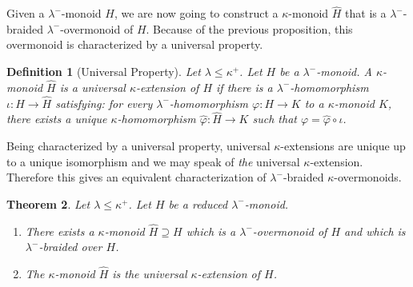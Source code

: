 \documentclass[a4paper,11pt,oneside]{amsart}
\newtheorem{teor}{Theorem}[section]
\newtheorem{defi}[teor]{Definition}
\theoremstyle{remark}
\newcommand{\defit}[1]{\textsf{#1}}
\begin{document}
Given a $\lambda^-$-monoid $H$, we are now going to construct a $\kappa$-monoid $\widehat H$ that is a $\lambda^-$-braided $\lambda^-$-overmonoid of $H$.
Because of the previous proposition, this overmonoid is characterized by a universal property.

\begin{defi}[Universal Property] \label{d:univprop}
  Let $\lambda \le \kappa^+$.
  Let $H$ be a $\lambda^-$-monoid.
  A $\kappa$-monoid $\widehat H$ is a \defit{universal $\kappa$-extension} of $H$ if there is a $\lambda^-$-homomorphism $\iota\colon H \to \widehat H$ satisfying: for every $\lambda^-$-homomorphism $\varphi\colon H \to K$ to a $\kappa$-monoid $K$, there exists a unique $\kappa$-homomorphism $\widehat{\varphi}\colon \widehat H \to K$ such that $\varphi = \widehat{\varphi} \circ \iota$.
\end{defi}

Being characterized by a universal property, universal $\kappa$-extensions are unique up to a unique isomorphism and we may speak of \emph{the} universal $\kappa$-extension.
Therefore this gives an equivalent characterization of $\lambda^-$-braided $\kappa$-overmonoids.

\begin{teor} \label{t:universal-exist}
  Let $\lambda \le \kappa^+$.
  Let $H$ be a reduced $\lambda^-$-monoid.
  \begin{enumerate}
  \item \label{ue:braided} There exists a $\kappa$-monoid $\widehat H \supseteq H$ which is a $\lambda^-$-overmonoid of $H$ and which is $\lambda^-$-braided over $H$.
  \item \label{ue:universal} The $\kappa$-monoid $\widehat H$ is the universal $\kappa$-extension of $H$.
  \end{enumerate}
\end{teor}
\end{document}
